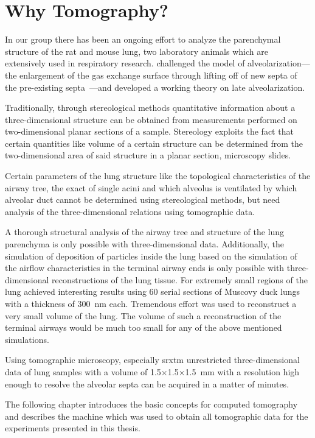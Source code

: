 \section{Why Tomography?}
In our group there has been an ongoing effort to analyze the parenchymal structure of the rat and mouse lung, two laboratory animals which are extensively used in respiratory research. \citet{Mund2008} challenged the model of alveolarization---the enlargement of the gas exchange surface through lifting off of new septa of the pre-existing septa~\cite{Burri1974}---and developed a working theory on late alveolarization.

Traditionally, through stereological methods quantitative information about a three-dimensional structure can be obtained from measurements performed on two-dimensional planar sections of a sample. Stereology exploits the fact that certain quantities like volume of a certain structure can be determined from the two-dimensional area of said structure in a planar section, \eg microscopy slides.

Certain parameters of the lung structure like the topological characteristics of the airway tree, the exact of single acini and which alveolus is ventilated by which alveolar duct cannot be determined using stereological methods, but need analysis of the three-dimensional relations using tomographic data.

A thorough structural analysis of the airway tree and structure of the lung parenchyma is only possible with three-dimensional data. Additionally, the simulation of deposition of particles inside the lung based on the simulation of the airflow characteristics in the terminal airway ends is only possible with three-dimensional reconstructions of the lung tissue. For extremely small regions of the lung \citet{Woodward2005} achieved interesting results using 60 serial sections of Muscovy duck lungs with a thickness of \SI{300}{\nano\meter} each. Tremendous effort was used to reconstruct a very small volume of the lung. The volume of such a reconstruction of the terminal airways would be much too small for any of the above mentioned simulations.

Using tomographic microscopy, especially \ac{srxtm} unrestricted three-dimensional data of lung samples with a volume of 1.5$\times$1.5$\times$\SI{1.5}{\milli\meter} with a resolution high enough to resolve the alveolar septa can be acquired in a matter of minutes.

The following chapter introduces the basic concepts for computed tomography and describes the machine which was used to obtain all tomographic data for the experiments presented in this thesis.